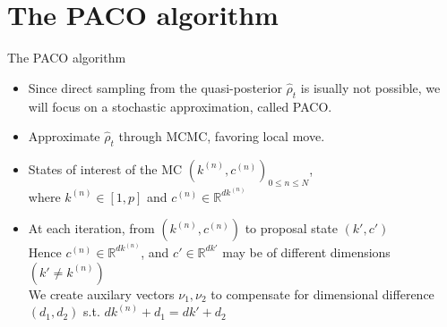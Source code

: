 \documentclass[10pt]{beamer}
\begin{document}
\section{The PACO algorithm}


\begin{frame}[fragile]{The PACO algorithm}
\begin{itemize}
\item Since direct sampling from the quasi-posterior $\hat\rho_{t}$ is isually not possible, we will focus on a stochastic approximation, called PACO.

\item Approximate $\hat\rho_{t}$ through MCMC, favoring local move.

\item States of interest of the MC $(k^{(n)}, c^{(n)})_{0 \leq n \leq N}$,\\ where $k^{(n)} \in [1,p]$ and $c^{(n)} \in \mathds{R}^{dk^{(n)}}$ 

\item At each iteration, from $(k^{(n)}, c^{(n)})$ to proposal state $(k', c')$\\
Hence $c^{(n)} \in \mathds{R}^{dk^{(n)}}$, and $c' \in \mathds{R}^{dk'}$ may be of different dimensions $(k' \neq k^{(n)})$\\
We create auxilary vectors $\nu_{1}, \nu_{2}$ to compensate for dimensional difference $(d_{1}, d_{2})$ s.t. $dk^{(n)} + d_{1} = dk' + d_{2}$\\

\end{itemize}
\end{frame}
\end{document}
